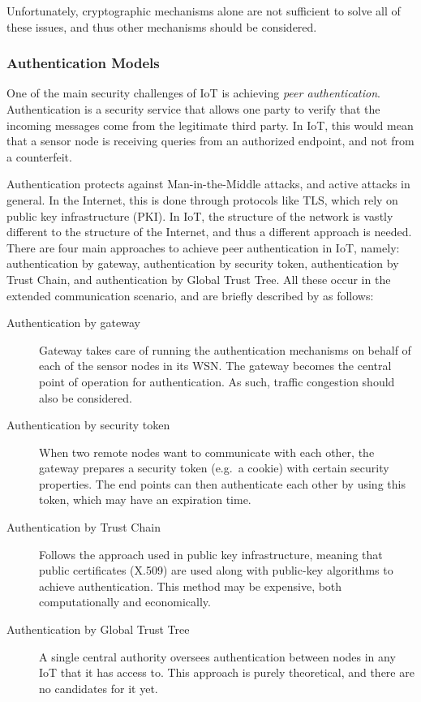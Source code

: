 \documentclass[12pt]{article}
\begin{document}
Unfortunately, cryptographic mechanisms alone are not sufficient to solve all of these issues, and thus other mechanisms should be considered.

\subsubsection{Authentication Models}

One of the main security challenges of IoT is achieving \emph{peer authentication}. Authentication is a security service that allows one party to verify that the incoming messages come from the legitimate third party. In IoT, this would mean that a sensor node is receiving queries from an authorized endpoint, and not from a counterfeit.

Authentication protects against Man-in-the-Middle attacks, and active attacks in general. In the Internet, this is done through protocols like TLS, which rely on public key infrastructure (PKI). In IoT, the structure of the network is vastly different to the structure of the Internet, and thus a different approach is needed. There are four main approaches to achieve peer authentication in IoT, namely: authentication by gateway, authentication by security token, authentication by Trust Chain, and authentication by Global Trust Tree. All these occur in the extended communication scenario, and are briefly described by \citet{Zhang:2015} as follows:
\begin{description}
\item[Authentication by gateway] Gateway takes care of running the authentication mechanisms on behalf of each of the sensor nodes in its WSN. The gateway becomes the central point of operation for authentication. As such, traffic congestion should also be considered.
\item[Authentication by security token] When two remote nodes want to communicate with each other, the gateway prepares a security token (e.g.\ a cookie) with certain security properties. The end points can then authenticate each other by using this token, which may have an expiration time. 
\item[Authentication by Trust Chain] Follows the approach used in public key infrastructure, meaning that public certificates (X.509) are used along with public-key algorithms to achieve authentication. This method may be expensive, both computationally and economically.
\item[Authentication by Global Trust Tree] A single central authority oversees authentication between nodes in any IoT that it has access to. This approach is purely theoretical, and there are no candidates for it yet.
\end{description}
\end{document}
